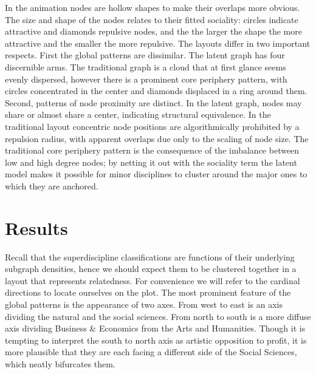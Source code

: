\documentclass[]{book}
\theoremstyle{definition}
\theoremstyle{definition}
\theoremstyle{definition}
\theoremstyle{remark}
\begin{document}
In the animation nodes are hollow shapes to make their overlaps more
obvious. The size and shape of the nodes relates to their fitted
sociality: circles indicate attractive and diamonds repulsive nodes, and
the the larger the shape the more attractive and the smaller the more
repulsive. The layouts differ in two important respects. First the
global patterns are dissimilar. The latent graph has four discernible
arms. The traditional graph is a cloud that at first glance seems evenly
dispersed, however there is a prominent core periphery pattern, with
circles concentrated in the center and diamonds displaced in a ring
around them. Second, patterns of node proximity are distinct. In the
latent graph, nodes may share or almost share a center, indicating
structural equivalence. In the traditional layout concentric node
positions are algorithmically prohibited by a repulsion radius, with
apparent overlaps due only to the scaling of node size. The traditional
core periphery pattern is the consequence of the imbalance between low
and high degree nodes; by netting it out with the sociality term the
latent model makes it possible for minor disciplines to cluster around
the major ones to which they are anchored.

\hypertarget{results}{%
\section{Results}\label{results}}

Recall that the superdiscipline classifications are functions of their
underlying subgraph densities, hence we should expect them to be
clustered together in a layout that represents relatedness. For
convenience we will refer to the cardinal directions to locate ourselves
on the plot. The most prominent feature of the global patterns is the
appearance of two axes. From west to east is an axis dividing the
natural and the social sciences. From north to south is a more diffuse
axis dividing Business \& Economics from the Arts and Humanities. Though
it is tempting to interpret the south to north axis as artistic
opposition to profit, it is more plausible that they are each facing a
different side of the Social Sciences, which neatly bifurcates them.
\end{document}

